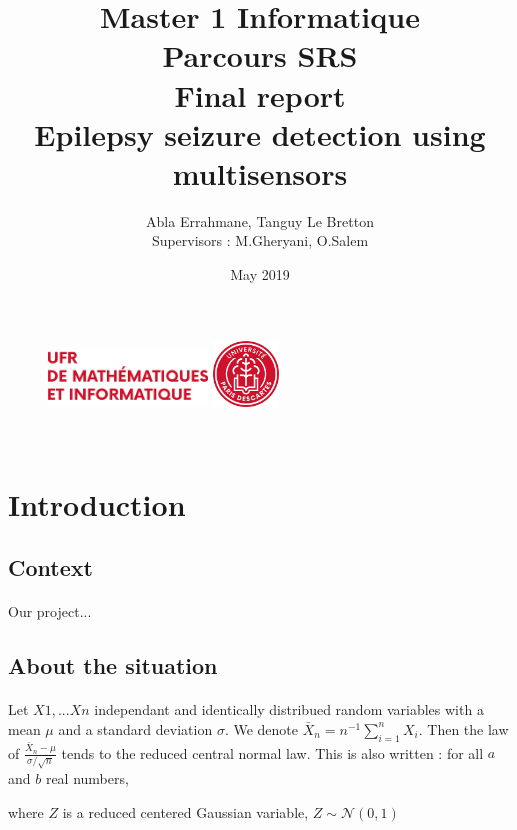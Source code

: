 \documentclass[11pt]{article}
\title{	\LARGE Master 1 Informatique \\
	Parcours SRS \\ 
	\vspace{20mm} 
\Huge	\textbf{Final report} \\ 
	\vspace{20mm} 
\Huge	\textbf{Epilepsy seizure detection using multisensors}
}
\author{Abla Errahmane, Tanguy Le Bretton \\ \vspace{5mm} Supervisors : M.Gheryani, O.Salem}
\date{May 2019}
\begin{document}
\begin{figure}[t]
	\includegraphics[width=120pt]{MI_logo.png}
	\includegraphics[width=50pt]{Descartes_logo.png}

\end{figure}

\maketitle

\newpage
~
\newpage
\tableofcontents
\newpage


\section{Introduction}
\subsection{Context}
\paragraph{}
Our project...

\subsection{About the situation}
\paragraph{}

Let $X1,...Xn$ independant and identically distribued random variables with a mean $\mu$ and a standard deviation $\sigma$. We denote $\bar{X}_n = n^{-1} \sum_{i=1}^{n}X_i$. Then the law of $\frac{\bar{X}_n- \mu}{\sigma / \sqrt{n}}$ tends to the reduced central normal law. This is also written : 
for all $a$ and $b$ real numbers, \newline

where $Z$ is a reduced centered Gaussian variable, $Z\sim \mathcal{N}(0,1)$
\end{document}
